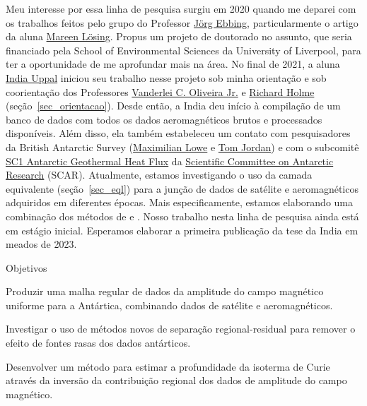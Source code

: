 \documentclass[10pt,a4paper,oneside]{book}
\newcommand{\VanderleiLink}{\href{https://www.pinga-lab.org/people/oliveira-jr.html}{Vanderlei C. Oliveira Jr.}}
\newcommand{\IndiaLink}{\href{https://www.compgeolab.org/team/\#indiauppal}{India Uppal}}
\begin{document}
Meu interesse por essa linha de pesquisa surgiu em 2020 quando me deparei com
os trabalhos feitos pelo grupo do Professor
\href{https://www.satellitengeophysik.uni-kiel.de/de/mitarbeiter/joerg_ebbing}{Jörg Ebbing},
particularmente o artigo \citet{Losing2020} da aluna
\href{https://www.satellitengeophysik.uni-kiel.de/de/mitarbeiter/mareen_loesing}{Mareen Lösing}.
Propus um projeto de doutorado no assunto, que seria financiado pela School of
Environmental Sciences da University of Liverpool, para ter a oportunidade de
me aprofundar mais na área.
No final de 2021, a aluna \IndiaLink{} iniciou seu trabalho nesse projeto sob
minha orientação e sob coorientação dos Professores \VanderleiLink{} e
\href{https://www.liverpool.ac.uk/~holme/}{Richard Holme}
(seção~\ref{sec_orientacao}).
Desde então, a India deu início à compilação de um banco de dados com todos os
dados aeromagnéticos brutos e processados disponíveis.
Além disso, ela também estabeleceu um contato com pesquisadores da
British Antarctic Survey (\href{https://www.bas.ac.uk/profile/maxwe32/}{Maximilian Lowe}
e \href{https://www.bas.ac.uk/profile/tomj/}{Tom Jordan})
e com o subcomitê \href{https://www.scar-instant.org/index.php/research-themes/theme-2-solid-earth-ice-interactions/sc1-antarctic-geothermal-heat-flux}{SC1 Antarctic Geothermal Heat Flux}
da \href{https://www.scar.org/}{Scientific Committee on Antarctic Research} (SCAR).
Atualmente, estamos investigando o uso da camada equivalente
(seção~\ref{sec_eql}) para a junção de dados de satélite e aeromagnéticos
adquiridos em diferentes épocas.
Mais especificamente, estamos elaborando uma combinação dos métodos de
\citet{Reis2020} e \citet{Soler2021}.
Nosso trabalho nesta linha de pesquisa ainda está em estágio inicial.
Esperamos elaborar a primeira publicação da tese da India em meados de 2023.


\begin{fancyenum}{\faBullseye}{Objetivos}
  \item Produzir uma malha regular de dados da amplitude do campo magnético
    uniforme para a Antártica, combinando dados de satélite e aeromagnéticos.
  \item Investigar o uso de métodos novos de separação regional-residual
    \citep[e.g.,][]{Florio2022} para remover o efeito de fontes rasas dos dados
    antárticos.
  \item Desenvolver um método para estimar a profundidade da isoterma de Curie
    através da inversão da contribuição regional dos dados de amplitude do
    campo magnético.
\end{fancyenum}
\end{document}
